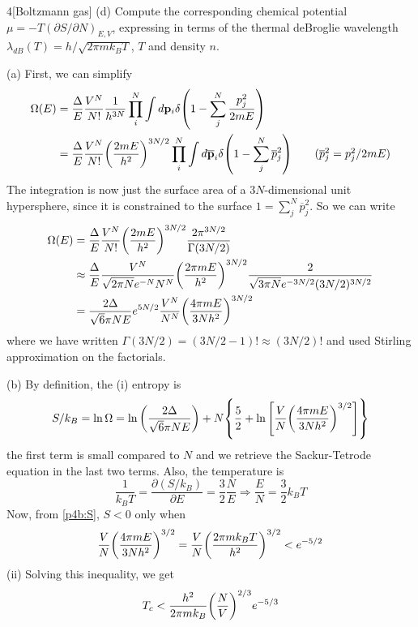 \documentclass[12pt]{article}
\begin{document}
\begin{problem}{4}[Boltzmann gas]
(d) Compute the corresponding chemical potential $\mu=-T(\partial S/\partial
N)_{E,V}$, expressing in terms of the thermal deBroglie wavelength
$\lambda_{dB}(T)=h/\sqrt{2\pi mk_BT}$, $T$ and density $n$.
\begin{solution}
(a) First, we can simplify
\begin{align}
    \Omega(E)
    &=\frac{\Delta}{E}\frac{V^N}{N!}\frac1{h^{3N}}\prod_i^N\int
    d\vb{p}_i\delta\qty(1-\sum_j^N\frac{p_j^2}{2mE})\notag\\
    &=\frac{\Delta}{E}\frac{V^N}{N!}\qty(\frac{2mE}{h^2})^{3N/2}\prod_i^N\int
    d\overline{\vb{p}}_i\delta\qty(1-\sum_j^N\overline{p}_j^2)\tag{$\overline{p}_j^2=p_j^2/2mE$}
\end{align}
The integration is now just the surface area of a $3N$-dimensional unit
hypersphere, since it is constrained to the surface
$1=\sum_j^N\overline{p}_j^2$. So we can write
\begin{align}
    \Omega(E)
    &=\frac{\Delta}{E}\frac{V^N}{N!}\qty(\frac{2mE}{h^2})^{3N/2}\frac{2\pi^{3N/2}}{\Gamma(3N/2)}\notag\\
    &\approx\frac{\Delta}{E}\frac{V^N}{\sqrt{2\pi N}e^{-N}N^N}\qty(\frac{2\pi
    mE}{h^2})^{3N/2}\frac{2}{\sqrt{3\pi N}e^{-3N/2}(3N/2)^{3N/2}}\notag\\
    &=\frac{2\Delta}{\sqrt6\pi NE}e^{5N/2}\frac{V^N}{N^N}\qty(\frac{4\pi
    mE}{3Nh^2})^{3N/2}
\end{align}
where we have written $\Gamma(3N/2)=(3N/2-1)!\approx(3N/2)!$ and used Stirling
approximation on the factorials.

(b) By definition, the (i) entropy is
\begin{equation}\label{p4b:S}
    S/k_B=\ln\Omega
    =\ln\qty(\frac{2\Delta}{\sqrt6\pi NE})+N\qty{\frac52
    +\ln\qty[\frac{V}{N}\qty(\frac{4\pi mE}{3Nh^2})^{3/2}]}
\end{equation}
the first term is small compared to $N$ and we retrieve the Sackur-Tetrode
equation in the last two terms. Also, the temperature is
\begin{equation}
    \frac1{k_BT}=\frac{\partial(S/k_B)}{\partial E}=\frac{3}2\frac{N}{E} 
    \Rightarrow\frac{E}{N}=\frac32k_BT
\end{equation}
Now, from \eqref{p4b:S}, $S<0$ only when
\begin{equation}
    \frac{V}{N}\qty(\frac{4\pi mE}{3Nh^2})^{3/2}
    =\frac{V}{N}\qty(\frac{2\pi mk_BT}{h^2})^{3/2}<e^{-5/2}
\end{equation}
(ii) Solving this inequality, we get
\begin{equation}
    T_c<\frac{h^2}{2\pi mk_B}\qty(\frac{N}{V})^{2/3}e^{-5/3}
\end{equation}


\end{solution}
\end{problem}
\end{document}
